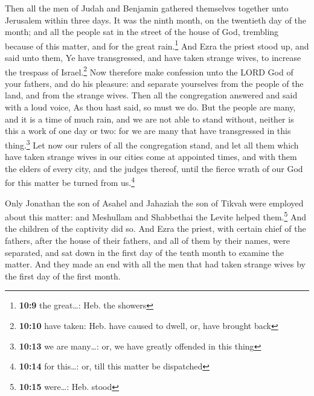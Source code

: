  Then all the men of Judah and Benjamin gathered
themselves together unto Jerusalem within three days. It was the ninth
month, on the twentieth day of the month; and all the people sat in the
street of the house of God, trembling because of this matter, and for
the great rain.\footnote{\textbf{10:9} the great\ldots: Heb. the showers}
 And Ezra the priest stood up, and said unto them, Ye
have transgressed, and have taken strange wives, to increase the
trespass of Israel.\footnote{\textbf{10:10} have taken: Heb. have caused
  to dwell, or, have brought back}  Now therefore make
confession unto the LORD God of your fathers, and do his pleasure: and
separate yourselves from the people of the land, and from the strange
wives.  Then all the congregation answered and said with
a loud voice, As thou hast said, so must we do.  But the
people are many, and it is a time of much rain, and we are not able to
stand without, neither is this a work of one day or two: for we are many
that have transgressed in this thing.\footnote{\textbf{10:13} we are
  many\ldots: or, we have greatly offended in this thing}
 Let now our rulers of all the congregation stand, and
let all them which have taken strange wives in our cities come at
appointed times, and with them the elders of every city, and the judges
thereof, until the fierce wrath of our God for this matter be turned
from us.\footnote{\textbf{10:14} for this\ldots: or, till this matter be
  dispatched}

 Only Jonathan the son of Asahel and Jahaziah the son of
Tikvah were employed about this matter: and Meshullam and Shabbethai the
Levite helped them.\footnote{\textbf{10:15} were\ldots: Heb. stood}
 And the children of the captivity did so. And Ezra the
priest, with certain chief of the fathers, after the house of their
fathers, and all of them by their names, were separated, and sat down in
the first day of the tenth month to examine the matter. 
And they made an end with all the men that had taken strange wives by
the first day of the first month.

